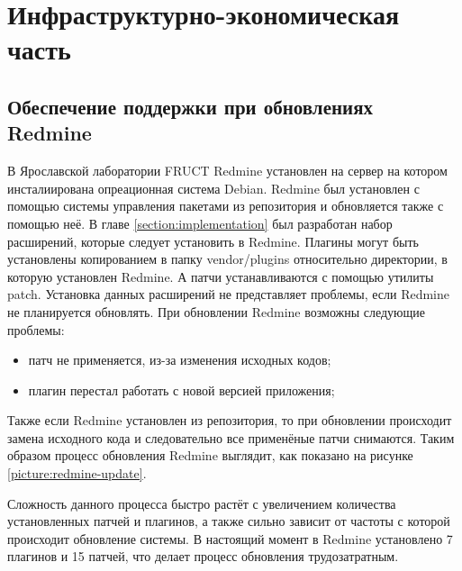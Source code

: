 \chapter{Инфраструктурно-экономическая часть}
\section{Обеспечение поддержки при обновлениях Redmine}
В Ярославской лаборатории FRUCT Redmine установлен на сервер на котором
инсталиирована опреационная система Debian. Redmine был установлен с помощью
системы управления пакетами из репозитория и обновляется также с помощью неё.
В главе \ref{section:implementation} был разработан набор расширений, которые
следует установить в Redmine. Плагины могут быть установлены 
копированием в папку vendor/plugins относительно директории, в которую
установлен Redmine. А патчи устанавливаются с помощью утилиты patch. Установка
данных расширений не представляет проблемы, если Redmine не планируется
обновлять. При обновлении Redmine возможны следующие проблемы:
\begin{itemize}
  \item патч не применяется, из-за изменения исходных кодов;
  \item плагин перестал работать с новой версией приложения;
\end{itemize}
Также если Redmine установлен из репозитория, то при обновлении происходит
замена исходного кода и следовательно все применёные патчи снимаются. Таким
образом процесс обновления Redmine выглядит, как показано на рисунке
\ref{picture:redmine-update}.


Сложность данного процесса быстро растёт с увеличением количества установленных
патчей и плагинов, а также сильно зависит от частоты с которой происходит
обновление системы. В настоящий момент в Redmine установлено 7 плагинов и 15
патчей, что делает процесс обновления трудозатратным.

